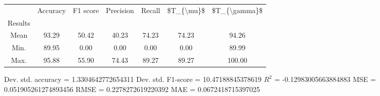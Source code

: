 \begin{tabular}{|c|c|c|c|c|c|c|}
\toprule
{} &  Accuracy &  F1 score &  Precision &  Recall &  \$T\_\{\textbackslash mu\}\$ &  \$T\_\{\textbackslash gamma\}\$ \\
Results &           &           &            &         &            &               \\
\hline
Mean    &     93.29 &     50.42 &      40.23 &   74.23 &      74.23 &         94.26 \\
Min.    &     89.95 &      0.00 &       0.00 &    0.00 &       0.00 &         89.99 \\
Max.    &     95.88 &     55.90 &      74.43 &   89.27 &      89.27 &        100.00 \\
\bottomrule
\end{tabular}

 Dev. std. accuracy = 1.3304642772654311
 Dev. std. F1-score = 10.47188845378619
 $R^2$ = -0.12983005663884883
 MSE = 0.051905261274893456
 RMSE = 0.2278272619220392
 MAE = 0.0672418715397025